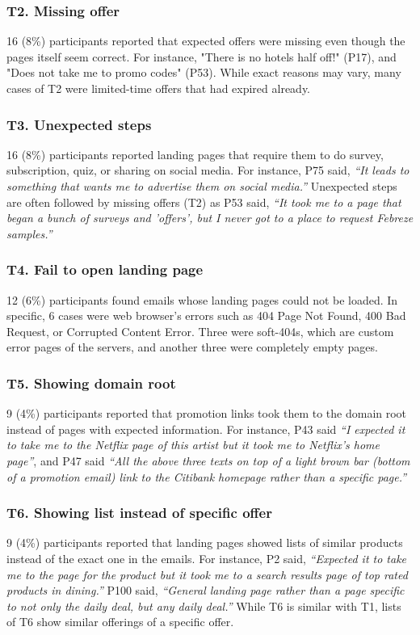 \documentclass{sigchi}
\begin{document}
\subsubsection{T2. Missing offer}
16 (8\%) participants reported that expected offers were missing even though the pages itself seem correct. For instance, "There is no hotels half off!" (P17), and "Does not take me to promo codes" (P53). While exact reasons may vary, many cases of T2 were limited-time offers that had expired already.  
\subsubsection{T3. Unexpected steps}
16 (8\%) participants reported landing pages that require them to do survey, subscription, quiz, or sharing on social media. For instance, P75 said, \textit{``It leads to something that wants me to advertise them on social media.''} Unexpected steps are often followed by missing offers (T2) as P53 said, \textit{``It took me to a page that began a bunch of surveys and 'offers', but I never got to a place to request Febreze samples.''} 
\subsubsection{T4. Fail to open landing page}
12 (6\%) participants found emails whose landing pages could not be loaded. In specific, 6 cases were web browser's errors such as \textsf{\small 404 Page Not Found}, \textsf{\small 400 Bad Request}, or \textsf{\small Corrupted Content Error}. Three were soft-404s, which are custom error pages of the servers, and another three were completely empty pages. 
\subsubsection{T5. Showing domain root}
9 (4\%) participants reported that promotion links took them to the domain root instead of pages with expected information. For instance, P43 said \textit{``I expected it to take me to the Netflix page of this artist but it took me to Netflix's home page''}, and P47 said \textit{``All the above three texts on top of a light brown bar (bottom of a promotion email) link to the Citibank homepage rather than a specific page.''} 
\subsubsection{T6. Showing list instead of specific offer} 
9 (4\%) participants reported that landing pages showed lists of similar products instead of the exact one in the emails. For instance, P2 said, \textit{``Expected it to take me to the page for the product but it took me to a search results page of top rated products in dining.''} P100 said, \textit{``General landing page rather than a page specific to not only the daily deal, but any daily deal.''} While T6 is similar with T1, lists of T6 show similar offerings of a specific offer.  
\end{document}
